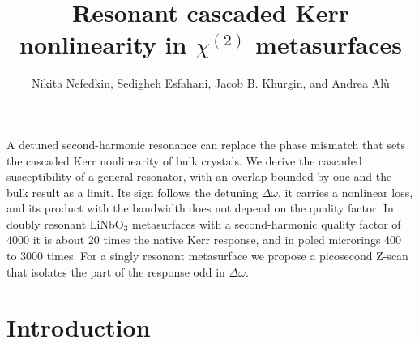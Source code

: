 \documentclass{optica-article}
\newcommand{\Dom}{\Delta\omega}
\begin{document}
\title{Resonant cascaded Kerr nonlinearity in $\chi^{(2)}$ metasurfaces}

\author{Nikita Nefedkin, Sedigheh Esfahani, Jacob B. Khurgin, and Andrea Al\`u}

\address{Photonics Initiative, Advanced Science Research Center, City University of New York, New York, New York 10031, USA\\
Department of Electrical and Computer Engineering, Johns Hopkins University, Baltimore, Maryland 21218, USA}


\begin{abstract*}
A detuned second-harmonic resonance can replace the phase mismatch that
sets the cascaded Kerr nonlinearity of bulk crystals.  We derive the
cascaded susceptibility of a general resonator, with an overlap bounded by
one and the bulk result as a limit.  Its sign follows the detuning $\Dom$,
it carries a nonlinear loss, and its product with the bandwidth does not
depend on the quality factor.  In doubly resonant LiNbO$_3$ metasurfaces
with a second-harmonic quality factor of 4000 it is about 20 times the
native Kerr response, and in poled microrings 400 to 3000 times.  For a
singly resonant metasurface we propose a picosecond Z-scan that isolates
the part of the response odd in $\Dom$.
\end{abstract*}


\section{Introduction}
\end{document}
